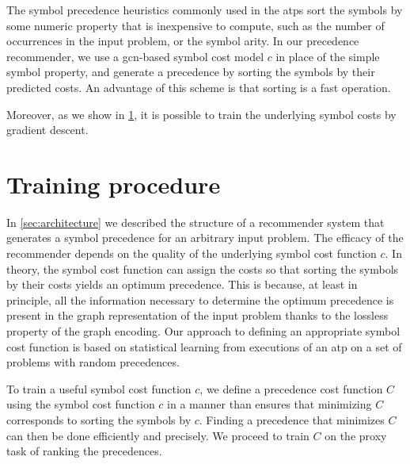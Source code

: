 The symbol precedence heuristics commonly used in the \glspl{atp} sort the symbols by some numeric property
that is inexpensive to compute,
such as the number of occurrences in the input problem, or the symbol arity.
In our precedence recommender,
we use a \gls{gcn}-based symbol cost model $c$ in place of the simple symbol property,
and generate a precedence by sorting the symbols by their predicted costs.
An advantage of this scheme is that sorting is a fast operation.

Moreover, as we show in \cref{sec:training}, it is possible
to train the underlying symbol costs by gradient descent.


\section{Training procedure}
\label{sec:training}

In \cref{sec:architecture} we described the structure of a recommender system that generates a symbol precedence for an arbitrary input problem.
The efficacy of the recommender depends on the quality of the underlying symbol cost function $c$.
In theory, the symbol cost function can assign the costs so that
sorting the symbols by their costs yields an optimum precedence.
This is because, at least in principle, all the information necessary 
to determine the optimum precedence is present in the graph representation of the input problem
thanks to the lossless property of the graph encoding.
Our approach to defining an appropriate symbol cost function is based on statistical learning
from executions of an \gls{atp} on a set of problems with random precedences.

To train a useful symbol cost function $c$,
we define a precedence cost function $C$ using the symbol cost function $c$
in a manner than ensures that minimizing $C$ corresponds to sorting the symbols by $c$.
Finding a precedence that minimizes $C$ can then be done efficiently and precisely.
We proceed to train $C$ on the proxy task of ranking the precedences.

